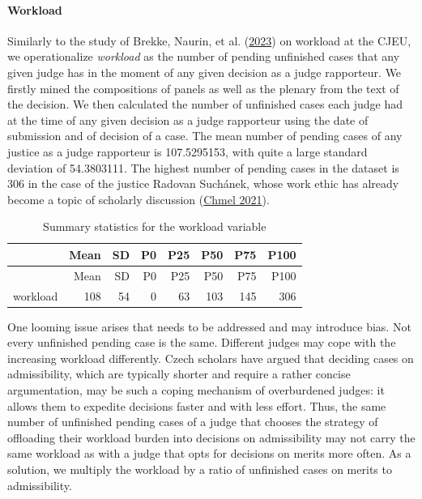 \documentclass[
  11pt,
]{article}
\begin{document}
\hypertarget{workload}{%
\paragraph*{Workload}\label{workload}}

Similarly to the study of Brekke, Naurin, et al.
(\protect\hyperlink{ref-brekkeThatOrderHow2023}{2023}) on workload at
the CJEU, we operationalize \emph{workload} as the number of pending
unfinished cases that any given judge has in the moment of any given
decision as a judge rapporteur. We firstly mined the compositions of
panels as well as the plenary from the text of the decision. We then
calculated the number of unfinished cases each judge had at the time of
any given decision as a judge rapporteur using the date of submission
and of decision of a case. The mean number of pending cases of any
justice as a judge rapporteur is 107.5295153, with quite a large
standard deviation of 54.3803111. The highest number of pending cases in
the dataset is 306 in the case of the justice Radovan Suchánek, whose
work ethic has already become a topic of scholarly discussion
(\protect\hyperlink{ref-chmelCoOvlivnujeUstavni2021}{Chmel 2021}).

\begin{longtable}[]{@{}lrrrrrrr@{}}
\caption{Summary statistics for the workload variable}\tabularnewline
\toprule\noalign{}
& Mean & SD & P0 & P25 & P50 & P75 & P100 \\
\midrule\noalign{}
\endfirsthead
\toprule\noalign{}
& Mean & SD & P0 & P25 & P50 & P75 & P100 \\
\midrule\noalign{}
\endhead
\bottomrule\noalign{}
\endlastfoot
workload & 108 & 54 & 0 & 63 & 103 & 145 & 306 \\
\end{longtable}

One looming issue arises that needs to be addressed and may introduce
bias. Not every unfinished pending case is the same. Different judges
may cope with the increasing workload differently. Czech scholars have
argued that deciding cases on admissibility, which are typically shorter
and require a rather concise argumentation, may be such a coping
mechanism of overburdened judges: it allows them to expedite decisions
faster and with less effort. Thus, the same number of unfinished pending
cases of a judge that chooses the strategy of offloading their workload
burden into decisions on admissibility may not carry the same workload
as with a judge that opts for decisions on merits more often. As a
solution, we multiply the workload by a ratio of unfinished cases on
merits to admissibility.
\end{document}
